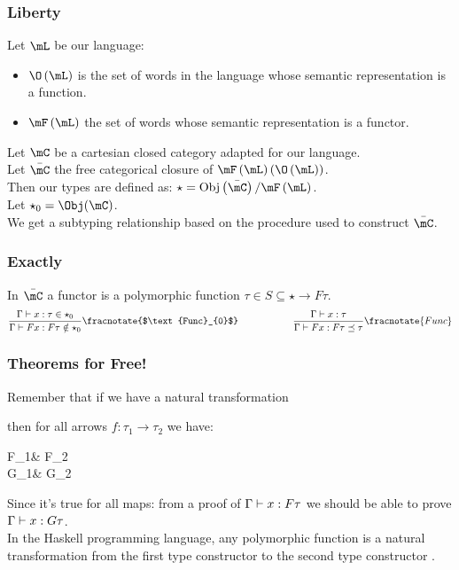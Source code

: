 \documentclass[math, english, info, noamsthm]{beamercours}
\begin{document}
\begin{frame}
	\frametitle{Liberty}
	Let $\mL$ be our language:
	\begin{itemize}
		\item $\O\left( \mL \right)$ is the set of words in the language whose semantic representation is a function.
		\item $\mF\left( \mL \right)$ the set of words whose semantic representation is a functor.
	\end{itemize}
	Let $\mC$ be a cartesian closed category adapted for our language. \pause\\
	Let $\bar{\mC}$ the free categorical closure of $\mF\left( \mL \right)\left(\O\left( \mL \right)\right)$.\\
	Then our types are defined as: $\star = \mathrm{Obj}\left( \bar{\mC} \right)/\mF\left( \mL \right)$.\\
	Let $\star_{0} = \Obj(\mC)$.\\
	We get a subtyping relationship based on the procedure used to construct $\bar{\mC}$.
\end{frame}

\begin{frame}
	\frametitle{Exactly}
	In $\bar{\mC}$ a functor is a polymorphic function $\tau \in S \subseteq \star \to F \tau$. \pause\\
	\begin{equation*}
		\frac{\Gamma\vdash x: \tau \in \star_{0}}{\Gamma\vdash F x: F\tau \notin \star_{0}}\fracnotate{$\text{Func}_{0}$} \hspace{2cm} \frac{\Gamma\vdash x: \tau}{\Gamma\vdash Fx : F\tau\preceq \tau}\fracnotate{Func}
	\end{equation*}
\end{frame}

\begin{frame}[fragile]
	\frametitle{Theorems for Free!}
	Remember that if we have a natural transformation  then for all arrows $f: \tau_{1} \to \tau_{2}$ we have:
	\begin{category}
		F\tau_{1}\ar[r, "Ff"] & F\tau_{2}\\
		G\tau_{1}\ar[r, "Gf"] & G\tau_{2}
	\end{category}
	\pause
	Since it's true for all maps: from a proof of $\Gamma\vdash x: F\tau$ we should be able to prove $\Gamma\vdash x: G\tau$.\\
	\pause
	In the Haskell programming language, any polymorphic function is a natural transformation from the first type constructor to the second type constructor \cite{wadlerTheoremsFree1989}.
\end{frame}
\end{document}
